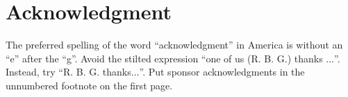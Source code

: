 \documentclass[conference]{IEEEtran}
\begin{document}
\section*{Acknowledgment}

The preferred spelling of the word ``acknowledgment'' in America is without 
an ``e'' after the ``g''. Avoid the stilted expression ``one of us (R. B. 
G.) thanks $\ldots$''. Instead, try ``R. B. G. thanks$\ldots$''. Put sponsor 
acknowledgments in the unnumbered footnote on the first page.

\end{document}
